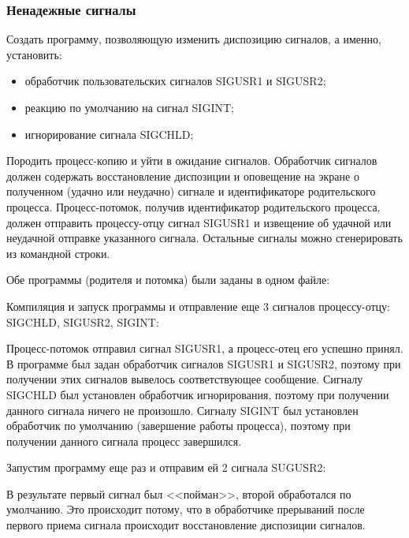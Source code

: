 \documentclass[a4paper]{article}
\begin{document}
	\subsubsection{Ненадежные сигналы}
	Создать программу, позволяющую изменить диспозицию сигналов, а именно, установить:
	\begin{itemize}
	\item обработчик пользовательских сигналов SIGUSR1 и SIGUSR2;
	\item реакцию по умолчанию на сигнал SIGINT;
	\item игнорирование сигнала SIGCHLD;	
	\end{itemize}

	Породить процесс-копию и уйти в ожидание сигналов. Обработчик сигналов должен содержать восстановление диспозиции и оповещение на экране о полученном (удачно или неудачно) сигнале и идентификаторе родительского процесса. Процесс-потомок, получив идентификатор родительского процесса, должен отправить процессу-отцу сигнал SIGUSR1 и извещение об удачной или неудачной отправке указанного сигнала. Остальные сигналы можно сгенерировать из командной строки.
	
	Обе программы (родителя и потомка) были заданы в одном файле:
	
	
	Компиляция и запуск программы и отправление еще 3 сигналов процессу-отцу: SIGCHLD, SIGUSR2, SIGINT:

	

	Процесс-потомок отправил сигнал SIGUSR1, а процесс-отец его успешно принял. В программе был задан обработчик сигналов SIGUSR1 и SIGUSR2, поэтому при получении этих сигналов вывелось соответствующее сообщение. Сигналу SIGCHLD был установлен обработчик игнорирования, поэтому при получении данного сигнала ничего не произошло. Сигналу SIGINT был установлен обработчик по умолчанию (завершение работы процесса), поэтому при получении данного сигнала процесс завершился.
	
	Запустим программу еще раз и отправим ей 2 сигнала SUGUSR2:
	
	
	В результате первый сигнал был <<пойман>>, второй обработался по умолчанию. Это происходит потому, что в обработчике прерываний после первого приема сигнала происходит восстановление диспозиции сигналов.
\end{document}
